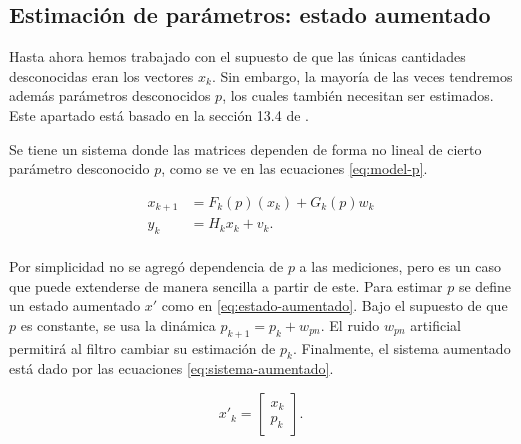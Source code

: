 



\subsection{Estimación de
parámetros: estado aumentado}\label{estimacion-de-parametros}

Hasta ahora hemos trabajado con el supuesto de que las únicas cantidades desconocidas eran los vectores \(x_k\). Sin embargo, la mayoría de las veces tendremos además parámetros desconocidos \(p\), los cuales también necesitan ser estimados. Este apartado está basado en la sección 13.4 de \cite{Simon2006}.

Se tiene un sistema donde las matrices dependen de forma no lineal de cierto parámetro desconocido \(p\), como se ve en las ecuaciones \ref{eq:model-p}.

\begin{equation}\label{eq:model-p}
\begin{aligned}
x_{k+1} &= F_k(p)(x_k) + G_k(p)w_k \\
y_{k} &= H_k x_k + v_k. \\ 
\end{aligned}
\end{equation}

Por simplicidad no se agregó dependencia de \(p\) a las mediciones, pero es un caso que puede extenderse de manera sencilla a partir de este. Para estimar \(p\) se define un estado aumentado \(x'\) como en \ref{eq:estado-aumentado}. Bajo el supuesto de que \(p\) es constante, se usa la dinámica \(p_{k+1} = p_k + w_{pn}\). El ruido \(w_{pn}\) artificial permitirá al filtro cambiar su estimación de \(p_k\). Finalmente, el sistema aumentado está dado por las ecuaciones \ref{eq:sistema-aumentado}.

\begin{equation}\label{eq:estado-aumentado}
x'_k = \begin{bmatrix}x_k \\ p_k \end{bmatrix}.
\end{equation}

